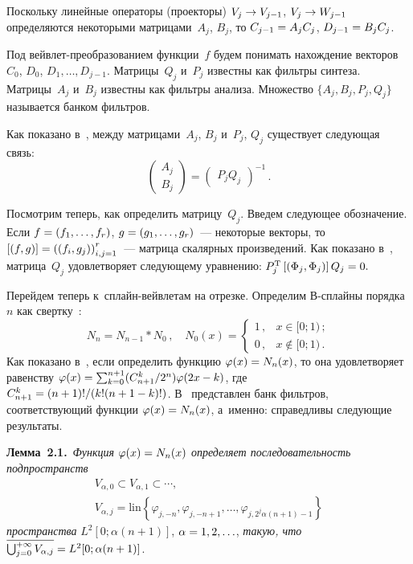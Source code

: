 \begin{multicols}{2}
Поскольку линейные операторы (проекторы) $V_{j} \hm\to V_{j-1}$,
$V_{j} \hm\to W_{j-1} $ определяются некоторыми матрицами~${A}_{j}$,
${B}_{j}$, то ${C}_{j-1} \hm={A}_{j} {C}_{j}$,
${D}_{j-1} \hm={B}_{j} {C}_{j}$.

Под вейвлет-преобра\-зо\-ва\-ни\-ем функции~$f$ будем понимать 
нахождение векторов ${C}_{0}$, ${D}_{0}$, ${D}_{1} ,
\dots, D_{j-1}$. Матрицы~${Q}_j$ и~${P}_j$ 
известны как фильт\-ры синтеза. Матрицы~${A}_j$ и~${B}_j$ 
известны как фильт\-ры анализа. Множество 
$\{{A}_j, {B}_j, {P}_j,{Q}_j\}$ 
называется банком фильтров.

Как показано в~\cite{ArticleFinkelstein}, между 
матрицами~${A}_{j}$, ${B}_{j}$ и~${P}_{j}$, 
${Q}_{j} $ существует следующая связь:
$$
\begin{pmatrix} {A}_{j} \\ {B}_{j} \end{pmatrix}=
\begin{pmatrix} {P}_{j} {Q}_{j}\end{pmatrix}^{-1}\,.
$$

Посмотрим теперь, как определить мат\-ри\-цу~${Q}_{j}$. 
Введем следующее обозначение. Если ${f}\hm=\left(f_{1} ,\dots, f_{r} \right)$,
${g}\hm=\left(g_{1} ,\dots,g_{r} \right)$~--- 
некоторые векторы, то $[({f},{g})]\hm=
\left(\left(f_{i} ,g_{j} \right)\right)_{i,j=1}^{r} $~--- 
мат\-ри\-ца скалярных произведений.  Как показано в~\cite{ArticleFinkelstein}, 
мат\-ри\-ца~${Q}_{j} $ удовлетворяет следующему уравнению: 
${P}_{j}^{\mathrm{T}} \left[\left(\Phi _{j}, \Phi _{j} 
\right)\right]{Q}_{j} \hm=0.$

Перейдем теперь к~сплайн-вейв\-ле\-там на отрезке. Определим В-сплай\-ны порядка~$n$  
как свертку~\cite{Chui}:
$$
N_{n} =N_{n-1} *N_{0}\,,\quad
N_{0} (x)=\begin{cases} 
1\,, & x\in [0;1)\,; \\ 
0\,, & x\notin [0;1)\,.
\end{cases}
$$
Как показано в~\cite{Chui}, если определить функцию $\varphi (x)\hm=N_{n} (x)$, 
то она удовлетворяет равенству $\varphi (x)\hm=\sum\nolimits _{k=0}^{n+1}
({C_{n+1}^{k} }/{2^{n}}) \varphi (2x\hm-k)$, где $C_{n+1}^k\hm={(n+1)!}/({k!(n\hm+1\hm-k)!})$.
В~\cite{Yurgu} пред\-став\-лен банк фильт\-ров, соответствующий функции  
$\varphi (x)\hm=N_{n} (x)$, а~именно:  справедливы следующие результаты.

\smallskip

\noindent
\textbf{Лемма~2.1.}\
\textit{Функция $\varphi(x)\hm=N_n(x)$ определяет последовательность подпространств}
\begin{multline*}
V_{\alpha,0}\subset V_{\alpha,1}\subset\cdots,\\
V_{\alpha,j}=\mathrm{lin}\left\{\varphi_{j,-n},\varphi_{j,-n+1},\dots,
\varphi_{j,2^j\alpha(n+1)-1}\right\}
\end{multline*}
\textit{пространства} ${L}^2[0;\alpha(n+1)]$, $\alpha\hm=1,2,\ldots$, 
\textit{такую, что} 
$\overline{\bigcup\nolimits_{j=0}^{+\infty}V_{\alpha,j}}\hm={L}^2
[0;\alpha(n+1)]$.


\end{multicols}
